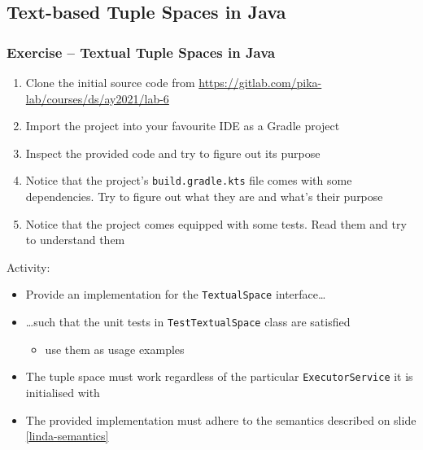 \documentclass[presentation]{beamer}\mode<presentation>{\usetheme{AMSCesenaPurpleAndGold}}
\newcommand{\labN}{6}
\newcommand{\labGroup}{https://gitlab.com/pika-lab/courses/ds/ay2021}
\newcommand{\labRepo}{\labGroup/lab-\labN}
\begin{document}
\startExercise

\subsection{Text-based Tuple Spaces in Java}

\begin{frame}[allowframebreaks]
\frametitle{Exercise \currentExercise{} -- Textual Tuple Spaces in Java}

\begin{enumerate}
	\item Clone the initial source code from \url{\labRepo}

	\medskip

	\item Import the project into your favourite IDE as a Gradle project

	\medskip

	\item Inspect the provided code and try to figure out its purpose

	\medskip

	\item Notice that the project's \texttt{build.gradle.kts} file comes with some dependencies.
	Try to figure out what they are and what's their purpose

	\medskip

	\item Notice that the project comes equipped with some tests.
	Read them and try to understand them
\end{enumerate}



\framebreak

Activity:
%
\bigskip
%
\begin{itemize}

	\item Provide an implementation for the \texttt{TextualSpace} interface\ldots

	\bigskip

	\item \ldots such that the \alert{unit tests} in \alert{\texttt{TestTextualSpace}} class are satisfied
	\begin{itemize}
		\item use them as usage examples
	\end{itemize}

	\bigskip

	\item The tuple space must work regardless of the particular \texttt{ExecutorService} it is initialised with

	\bigskip

	\item The provided implementation must adhere to the \alert{\linda{} semantics} described on slide \ref{linda-semantics}

%
\end{itemize}
\end{frame}
\end{document}
